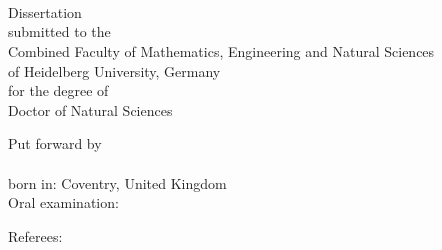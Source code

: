 %
\begin{titlepage}
	\tgherosfont
	\centering

	\vspace*{\fill}
	{\large \thesisUniversity} \\[5mm]
	{\LARGE \color{ctcolortitle}\textbf{\thesisTitle} \\[10mm]}
	{\Large \thesisName} \\[8cm]
	\vspace*{\fill}


\end{titlepage}

\begin{titlepage}
	\centering
	\begin{large}
		Dissertation\\[5mm]
		submitted to the\\
		Combined Faculty of Mathematics, Engineering and Natural Sciences\\
		of Heidelberg University, Germany\\
		for the degree of\\[5mm]
		Doctor of Natural Sciences\\

		\hfill
		\vfill

		Put forward by\\[5mm]
		\thesisName\\
		born in: Coventry, United Kingdom\\[5mm]
		Oral examination: \thesisExamDate\\
	\end{large}
\end{titlepage}

\begin{titlepage}
	\centering
	{\Large \thesisTitle}
	\hfill
	\vfill

	\begin{minipage}[t]{.3\textwidth}
		\raggedleft
		Referees:
	\end{minipage}
	\hspace*{.1\textwidth}
	\begin{minipage}[t]{.585\textwidth}
		{\thesisFirstReviewer} \\
		{\thesisSecondReviewer} \\
	\end{minipage} \\[5mm]

	\newpage
\end{titlepage}


